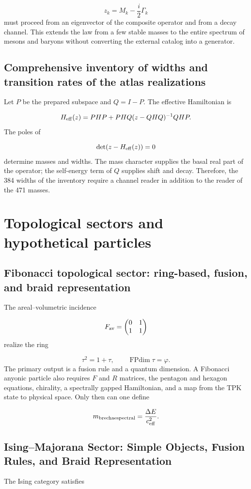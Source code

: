 \[
 z_k=M_k-\frac{i}{2}\Gamma_k
\]
must proceed from an eigenvector of the composite operator and from a decay channel. This extends the law from a few stable masses to the entire spectrum of mesons and baryons without converting the external catalog into a generator.

\subsection{Comprehensive inventory of widths and transition rates of the atlas realizations}
Let \(P\) be the prepared subspace and \(Q=I-P\). The effective Hamiltonian is

\[
 H_{\rm eff}(z)
 =PHP+PHQ(z-QHQ)^{-1}QHP.
\]
The poles of

\[
 \det(z-H_{\rm eff}(z))=0
\]
determine masses and widths. The mass character supplies the basal real part of the operator; the self-energy term of \(Q\) supplies shift and decay. Therefore, the 384 widths of the inventory require a channel reader in addition to the reader of the 471 masses.

\section{Topological sectors and hypothetical particles}
\subsection{Fibonacci topological sector: ring-based, fusion, and braid representation}
The areal--volumetric incidence

\[
 F_{\rm av}=
 \begin{pmatrix}
 0&1\\1&1
 \end{pmatrix}
\]
realize the ring

\[
 \tau^2=1+\tau,\qquad
 \operatorname{FPdim}\tau=\varphi.
\]
The primary output is a fusion rule and a quantum dimension. A Fibonacci anyonic particle also requires \(F\) and \(R\) matrices, the pentagon and hexagon equations, chirality, a spectrally gapped Hamiltonian, and a map from the TPK state to physical space. Only then can one define

\[
 m_{\rm brecha espectral}=\frac{\Delta E}{c_{\rm eff}^2}.
\]
\subsection{Ising–Majorana Sector: Simple Objects, Fusion Rules, and Braid Representation}
The Ising category satisfies

